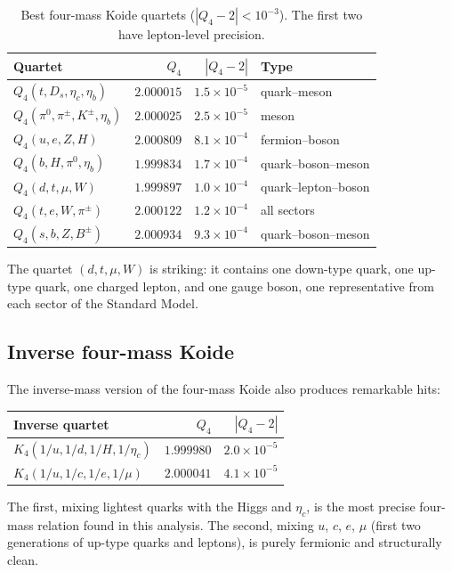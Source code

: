 \documentclass[11pt]{article}
\begin{document}
\begin{table}[h]
\centering\small
\begin{tabular}{@{}l r r l@{}}
\toprule
Quartet & $Q_4$ & $|Q_4-2|$ & Type \\
\midrule
$Q_4(t,D_s,\eta_c,\eta_b)$ & $2.000015$ & $1.5\times 10^{-5}$ & quark--meson \\
$Q_4(\pi^0,\pi^\pm,K^\pm,\eta_b)$ & $2.000025$ & $2.5\times 10^{-5}$ & meson \\
$Q_4(u,e,Z,H)$ & $2.000809$ & $8.1\times 10^{-4}$ & fermion--boson \\
$Q_4(b,H,\pi^0,\eta_b)$ & $1.999834$ & $1.7\times 10^{-4}$ & quark--boson--meson \\
$Q_4(d,t,\mu,W)$ & $1.999897$ & $1.0\times 10^{-4}$ & quark--lepton--boson \\
$Q_4(t,e,W,\pi^\pm)$ & $2.000122$ & $1.2\times 10^{-4}$ & all sectors \\
$Q_4(s,b,Z,B^\pm)$ & $2.000934$ & $9.3\times 10^{-4}$ & quark--boson--meson \\
\bottomrule
\end{tabular}
\caption{Best four-mass Koide quartets ($|Q_4-2|<10^{-3}$).
The first two have lepton-level precision.}
\end{table}

\noindent
The quartet $(d,t,\mu,W)$ is striking: it contains one down-type
quark, one up-type quark, one charged lepton, and one gauge boson,
one representative from each sector of the Standard Model.

\subsection{Inverse four-mass Koide}

The inverse-mass version of the four-mass Koide also produces
remarkable hits:
\begin{center}\small
\begin{tabular}{@{}l r r@{}}
\toprule
Inverse quartet & $Q_4$ & $|Q_4-2|$ \\
\midrule
$K_4(1/u,1/d,1/H,1/\eta_c)$ & $1.999980$ & $2.0\times 10^{-5}$ \\
$K_4(1/u,1/c,1/e,1/\mu)$ & $2.000041$ & $4.1\times 10^{-5}$ \\
\bottomrule
\end{tabular}
\end{center}

\noindent
The first, mixing lightest quarks with the Higgs and $\eta_c$,
is the most precise four-mass relation found in this analysis.
The second, mixing $u$, $c$, $e$, $\mu$ (first two generations
of up-type quarks and leptons), is purely fermionic and
structurally clean.
\end{document}
